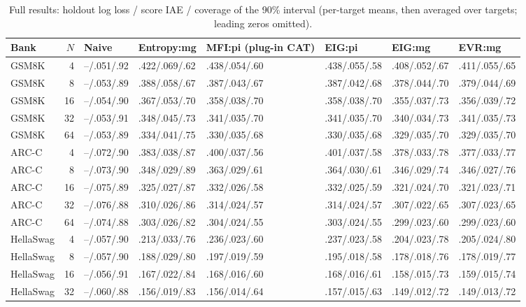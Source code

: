 \begin{table}[p]
\centering\scriptsize
\caption{Full results: holdout log loss / score IAE / coverage of the 90\% interval (per-target means, then averaged over targets; leading zeros omitted).}
\label{tab:full}
\setlength{\tabcolsep}{2.5pt}
\begin{tabular}{@{}lrllllll@{}}
\toprule
Bank & $N$ & Naive & Entropy:mg & MFI:pi (plug-in CAT) & EIG:pi & EIG:mg & EVR:mg \\
\midrule
GSM8K & 4 & --/.051/.92 & .422/.069/.62 & .438/.054/.60 & .438/.055/.58 & .408/.052/.67 & .411/.055/.65 \\
GSM8K & 8 & --/.053/.89 & .388/.058/.67 & .387/.043/.67 & .387/.042/.68 & .378/.044/.70 & .379/.044/.69 \\
GSM8K & 16 & --/.054/.90 & .367/.053/.70 & .358/.038/.70 & .358/.038/.70 & .355/.037/.73 & .356/.039/.72 \\
GSM8K & 32 & --/.053/.91 & .348/.045/.73 & .341/.035/.70 & .341/.035/.70 & .340/.034/.73 & .341/.035/.73 \\
GSM8K & 64 & --/.053/.89 & .334/.041/.75 & .330/.035/.68 & .330/.035/.68 & .329/.035/.70 & .329/.035/.70 \\
\addlinespace[1pt]
ARC-C & 4 & --/.072/.90 & .383/.038/.87 & .400/.037/.56 & .401/.037/.58 & .378/.033/.78 & .377/.033/.77 \\
ARC-C & 8 & --/.073/.90 & .348/.029/.89 & .363/.029/.61 & .364/.030/.61 & .346/.029/.74 & .346/.027/.76 \\
ARC-C & 16 & --/.075/.89 & .325/.027/.87 & .332/.026/.58 & .332/.025/.59 & .321/.024/.70 & .321/.023/.71 \\
ARC-C & 32 & --/.076/.88 & .310/.026/.86 & .314/.024/.57 & .314/.024/.57 & .307/.022/.65 & .307/.023/.65 \\
ARC-C & 64 & --/.074/.88 & .303/.026/.82 & .304/.024/.55 & .303/.024/.55 & .299/.023/.60 & .299/.023/.60 \\
\addlinespace[1pt]
HellaSwag & 4 & --/.057/.90 & .213/.033/.76 & .236/.023/.60 & .237/.023/.58 & .204/.023/.78 & .205/.024/.80 \\
HellaSwag & 8 & --/.057/.90 & .188/.029/.80 & .197/.019/.59 & .195/.018/.58 & .178/.018/.76 & .178/.019/.77 \\
HellaSwag & 16 & --/.056/.91 & .167/.022/.84 & .168/.016/.60 & .168/.016/.61 & .158/.015/.73 & .159/.015/.74 \\
HellaSwag & 32 & --/.060/.88 & .156/.019/.83 & .156/.014/.64 & .157/.015/.63 & .149/.012/.72 & .149/.013/.72 \\

\end{tabular}
\end{table}

